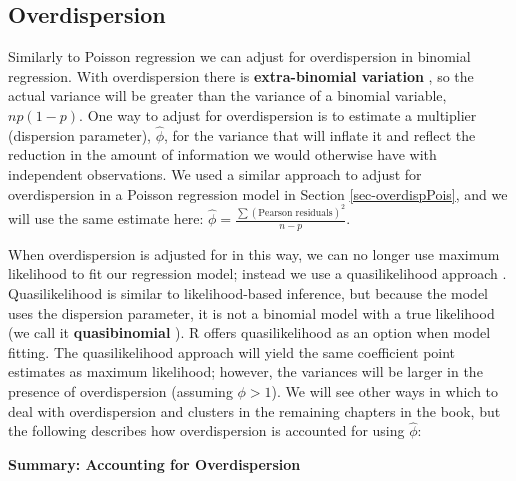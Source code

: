 \documentclass[
]{krantz}
\begin{document}
\hypertarget{sec-logOverdispersion}{%
\subsection{Overdispersion}\label{sec-logOverdispersion}}

Similarly to Poisson regression we can adjust for overdispersion  in binomial regression. With overdispersion there is \textbf{extra-binomial variation} , so the actual variance will be greater than the variance of a binomial variable, \(np(1-p)\). One way to adjust for overdispersion is to estimate a multiplier (dispersion parameter), \(\hat{\phi}\), for the variance that will inflate it and reflect the reduction in the amount of information we would otherwise have with independent observations. We used a similar approach to adjust for overdispersion in a Poisson regression model in Section \ref{sec-overdispPois}, and we will use the same estimate here: \(\hat\phi=\frac{\sum(\textrm{Pearson residuals})^2}{n-p}\).

When overdispersion is adjusted for in this way, we can no longer use maximum likelihood to fit our regression model; instead we use a quasilikelihood approach . Quasilikelihood is similar to likelihood-based inference, but because the model uses the dispersion parameter, it is not a binomial model with a true likelihood (we call it \textbf{quasibinomial} ). R offers quasilikelihood as an option when model fitting. The quasilikelihood approach will yield the same coefficient point estimates as maximum likelihood; however, the variances will be larger in the presence of overdispersion (assuming \(\phi>1\)). We will see other ways in which to deal with overdispersion and clusters in the remaining chapters in the book, but the following describes how overdispersion is accounted for using \(\hat{\phi}\):
\vspace{5mm}

\textbf{Summary: Accounting for Overdispersion}
\end{document}
